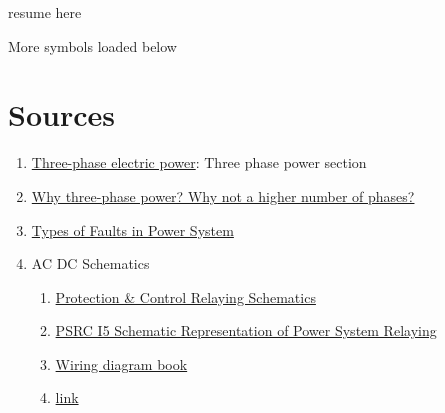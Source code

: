 \begin{todo}
    \item resume here
\end{todo}

More symbols loaded below



\section{Sources}
\begin{enumerate}
    \item \href{https://en.wikipedia.org/wiki/Three-phase_electric_power}{Three-phase electric power}: Three phase power section
    \item \href{https://electronics.stackexchange.com/questions/185308/why-three-phase-power-why-not-a-higher-number-of-phases}{Why three-phase power? Why not a higher number of phases?}
    \item \href{https://circuitglobe.com/types-of-faults-in-power-system.html}{Types of Faults in Power System}
    \item AC DC Schematics
    \begin{enumerate}
        \item \href{https://electrical-engineering-portal.com/ac-dc-schematics-protection-control-relaying}{Protection \& Control Relaying Schematics}
        \item \href{https://www.pes-psrc.org/kb/report/047.pdf}{PSRC I5 Schematic Representation of Power System Relaying}
        \item \href{https://www.daltco.com/sites/daltco.com/files/resource/schneider-wiring-diagram-book.pdf}{Wiring diagram book}
        \item \href{https://www.studyforfe.com/blog/fundamentals-of-single-line-diagrams/}{link}
    \end{enumerate}
\end{enumerate}